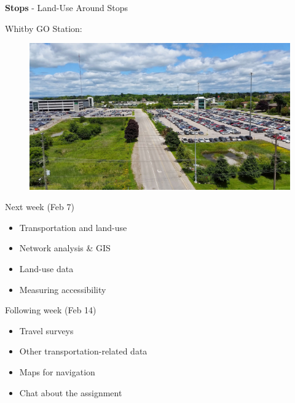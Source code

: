 \documentclass[aspectratio=169]{beamer}
\begin{document}
\begin{frame}
	
	\textbf{Stops} - Land-Use Around Stops
	
	\vspace{2mm}
	
	Whitby GO Station:
	\begin{figure}
		\centering
		\includegraphics[width=0.98\linewidth]{images/whitby.jpg}
	\end{figure}
	
\end{frame}











\begin{frame}
	
	Next week (Feb 7)
	
	\begin{itemize}
		\item Transportation and land-use
		\item Network analysis \& GIS
		\item Land-use data
		\item Measuring accessibility
	\end{itemize}

	Following week (Feb 14)
	
	\begin{itemize}
		\item Travel surveys
		\item Other transportation-related data
		\item Maps for navigation
		\item Chat about the assignment
	\end{itemize}
	
\end{frame}
\end{document}

